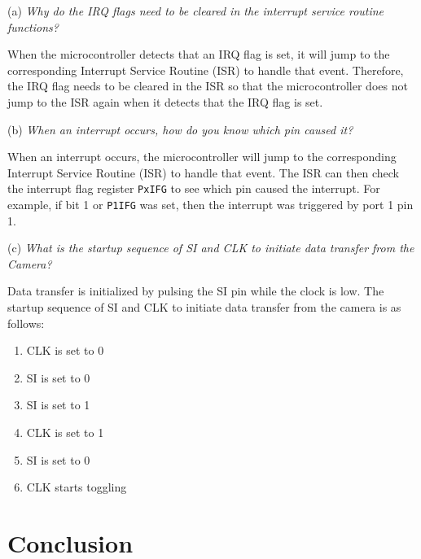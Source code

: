 \documentclass[CMPE]{KGCOEReport}
\begin{document}
(a) \emph{Why do the IRQ flags need to be cleared in the interrupt service routine functions?}

When the microcontroller detects that an IRQ flag is set, it will jump to the corresponding Interrupt Service Routine (ISR) to handle that event. Therefore, the IRQ flag needs to be cleared in the ISR so that the microcontroller does not jump to the ISR again when it detects that the IRQ flag is set.
\bigskip

(b) \emph{When an interrupt occurs, how do you know which pin caused it?}

When an interrupt occurs, the microcontroller will jump to the corresponding Interrupt Service Routine (ISR) to handle that event. The ISR can then check the interrupt flag register \verb|PxIFG| to see which pin caused the interrupt. For example, if bit 1 or \verb|P1IFG| was set, then the interrupt was triggered by port 1 pin 1.
\bigskip

(c) \emph{What is the startup sequence of SI and CLK to initiate data transfer from the Camera?}


Data transfer is initialized by pulsing the SI pin while the clock is low. The startup sequence of SI and CLK to initiate data transfer from the camera is as follows:

\begin{enumerate}
    \item CLK is set to 0
    \item SI is set to 0
    \item SI is set to 1
    \item CLK is set to 1
    \item SI is set to 0
    \item CLK starts toggling
\end{enumerate}

\section*{Conclusion}
\end{document}
